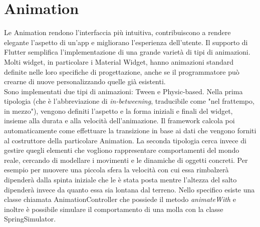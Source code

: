 	\section{Animation}
	Le Animation rendono l'interfaccia più intuitiva, contribuiscono a
	rendere elegante 
	l'aspetto di un'app e migliorano l'esperienza dell'utente. Il
	supporto di Flutter semplifica l'implementazione di una grande varietà di tipi di
	animazioni. Molti widget, in particolare i Material Widget, hanno
	animazioni standard definite nelle loro specifiche di progettazione, 
	anche se il programmatore può crearne di nuove personalizzando quelle già esistenti. \\
	Sono implementati due tipi di animazioni: Tween e Physic-based. Nella prima tipologia
	(che è l'abbreviazione di \textit{in-betweening}, traducibile come "nel frattempo,
	in mezzo"), vengono definiti l'aspetto e la forma iniziali e finali del
	widget, insieme alla durata e alla velocità dell'animazione. Il framework
	calcola poi automaticamente come effettuare la transizione in base ai dati
	che vengono forniti al costruttore della particolare Animation. La seconda
	tipologia cerca invece di gestire quegli elementi che vogliono rappresentare
	comportamenti del mondo reale, cercando di modellare i movimenti e le
	dinamiche di oggetti concreti. Per esempio per muovere una piccola sfera la
	velocità con cui essa rimbalzerà dipenderà dalla spinta iniziale che le è
	stata posta mentre l'altezza del salto dipenderà invece da quanto essa sia lontana dal terreno.
	Nello specifico esiste una classe chiamata AnimationController che possiede
	il metodo \textit{animateWith} e inoltre è possibile simulare il
	comportamento di una molla con la classe SpringSimulator.
	


	
